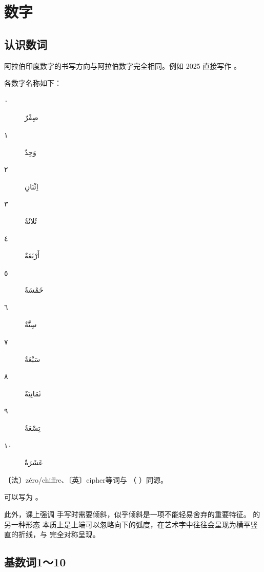 \chapter{数字}

\section{ 认识数词}


阿拉伯印度数字的书写方向与阿拉伯数字完全相同。例如 2025 直接写作 。

各数字名称如下：

\begin{Arabic}
    \begin{multicols}{2}
    \begin{description}
        \item[٠] صِفْرٌ
        \item[١] وَحِدٌ
        \item[٢] اِثْنَانِ
        \item[٣] ثَلاثَةٌ
        \item[٤] أَرْبَعَةٌ
        \item[٥] خَمْسَةٌ
        \item[٦] سِتَّةٌ
        \item[٧] سَبْعَةٌ
        \item[٨] ثَمَانِيَةٌ
        \item[٩] تِسْعَةٌ
        \item[١٠] عَشَرَةٌ
    \end{description}
    \end{multicols}
\end{Arabic}

〔法〕zéro/chiffre、〔英〕cipher等词与 （  ）同源。

\newfontfamily{}

\begin{attention}
     可以写为 。
\end{attention}

\begin{note}
    此外，课上强调  手写时需要倾斜，似乎倾斜是一项不能轻易舍弃的重要特征。  的另一种形态  本质上是上端可以忽略向下的弧度，在艺术字中往往会呈现为横平竖直的折线，与  完全对称呈现。
\end{note}

\section{  基数词1～10}

